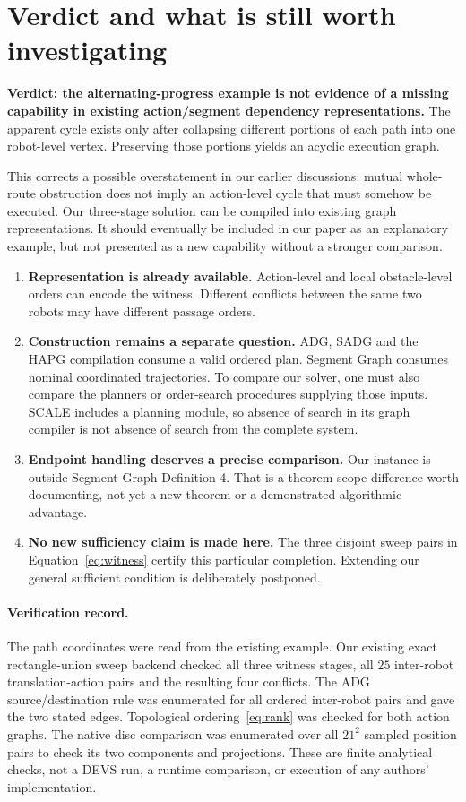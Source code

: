 \documentclass[11pt,a4paper]{article}
\begin{document}
\clearpage
\section{Verdict and what is still worth investigating}
\textbf{Verdict: the alternating-progress example is not evidence of a missing
capability in existing action/segment dependency representations.} The apparent
cycle exists only after collapsing different portions of each path into one
robot-level vertex. Preserving those portions yields an acyclic execution graph.

This corrects a possible overstatement in our earlier discussions: mutual
whole-route obstruction does not imply an action-level cycle that must somehow
be executed. Our three-stage solution can be compiled into existing graph
representations. It should eventually be included in our paper as an explanatory
example, but not presented as a new capability without a stronger comparison.

\begin{enumerate}
\item \textbf{Representation is already available.} Action-level and local
obstacle-level orders can encode the witness. Different conflicts between the
same two robots may have different passage orders.
\item \textbf{Construction remains a separate question.} ADG, SADG and the HAPG
compilation consume a valid ordered plan. Segment Graph consumes nominal
coordinated trajectories. To compare our solver, one must also compare the
planners or order-search procedures supplying those inputs. SCALE includes a
planning module, so absence of search in its graph compiler is not absence of
search from the complete system.
\item \textbf{Endpoint handling deserves a precise comparison.} Our instance is
outside Segment Graph Definition 4. That is a theorem-scope difference worth
documenting, not yet a new theorem or a demonstrated algorithmic advantage.
\item \textbf{No new sufficiency claim is made here.} The three disjoint sweep
pairs in Equation~\eqref{eq:witness} certify this particular completion. Extending
our general sufficient condition is deliberately postponed.
\end{enumerate}

\paragraph{Verification record.}
The path coordinates were read from the existing example. Our existing exact
rectangle-union sweep backend checked all three witness stages, all $25$
inter-robot translation-action pairs and the resulting four conflicts. The ADG
source/destination rule was enumerated for all ordered inter-robot pairs and
gave the two stated edges. Topological ordering~\eqref{eq:rank} was checked for
both action graphs. The native disc comparison was enumerated over all
$21^2$ sampled position pairs to check its two components and projections.
These are finite analytical checks, not a DEVS run, a runtime comparison, or
execution of any authors' implementation.
\end{document}
